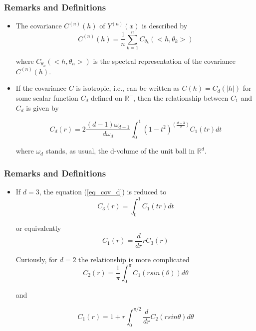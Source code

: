 \documentclass{beamer}
\begin{document}
\begin{frame}
\frametitle{Remarks and Definitions}
\begin{itemize}
\item The covariance $C^{(n)}(h)$ of $Y^{(n)}(x)$ is described by
\begin{equation}
C^{(n)}(h) = \frac{1}{n} \sum_{k=1}^{n} C_{\theta_k}(<h, \theta_k>)
\end{equation}

where $C_{\theta_n}(<h, \theta_n>)$ is the spectral representation of the covariance $C^{(n)}(h)$.

\item If the covariance $C$ is isotropic, i.e., can be written as $C(h)=C_d(|h|)$ for some scalar function $C_d$ defined on 
$\mathbb{R}^{+}$, then the relationship between $C_1$ and $C_d$ is given by

\begin{equation}\label{eq_cov_d}
 C_d(r) = 2 \frac{(d-1)\omega_{d-1}}{d\omega_{d}} \int_{0}^{1}(1-t^2)^(\frac{d-3}{2})C_1(tr) dt
\end{equation}

where $\omega_{d}$ stands, as usual, the d-volume of the unit ball in $\mathbb{R}^d$. \cite{l2002}
\end{itemize}
\end{frame}

\begin{frame}
 \frametitle{Remarks and Definitions}
 \begin{itemize}
  \item If $d=3$, the equation (\ref{eq_cov_d}) is reduced to
  \begin{equation}
    C_3(r) = \int_{0}^{1}C_1(tr)dt
  \end{equation}
  
  or equivalently
  \begin{equation}
   C_1(r) = \frac{d}{dr}rC_3(r)
  \end{equation}

  Curiously, for $d=2$ the relationship is more complicated
  \begin{equation}
   C_2(r) = \frac{1}{\pi}\int_{0}^{\pi}C_1(r sin(\theta))d\theta
  \end{equation}
  
  and
  
  \begin{equation}
   C_1(r) = 1 + r \int_{0}^{\pi/2} \frac{d}{dr}C_2(r sin \theta) d\theta
  \end{equation}


 \end{itemize}

\end{frame}
\end{document}
